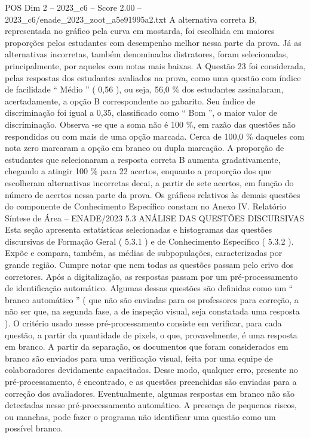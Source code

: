 \begin{textsample}{POS Dim 2 – 2023\_c6 – Score 2.00 – 2023\_c6/enade\_2023\_zoot\_a5e91995a2.txt}
A alternativa correta B, representada no gráfico pela curva em mostarda, foi escolhida em maiores proporções pelos estudantes com desempenho melhor nessa parte da prova.
Já as alternativas incorretas, também denominadas distratores, foram selecionadas, principalmente, por aqueles com notas mais baixas.
A Questão 23 foi considerada, pelas respostas dos estudantes avaliados na prova, como uma questão com índice de facilidade “ Médio ” ( 0,56 ), ou seja, 56,0 \% dos estudantes assinalaram, acertadamente, a opção B correspondente ao gabarito.
Seu índice de discriminação foi igual a 0,35, classificado como “ Bom ”, o maior valor de discriminação.
Observa -se que a soma não é 100 \%, em razão das questões não respondidas ou com mais de uma opção marcada.
Cerca de 100,0 \% daqueles com nota zero marcaram a opção em branco ou dupla marcação.
A proporção de estudantes que selecionaram a resposta correta B aumenta gradativamente, chegando a atingir 100 \% para 22 acertos, enquanto a proporção dos que escolheram alternativas incorretas decai, a partir de sete acertos, em função do número de acertos nessa parte da prova.
Os gráficos relativos às demais questões do componente de Conhecimento Específico constam no Anexo IV.
Relatório Síntese de Área – ENADE/2023 5.3 ANÁLISE DAS QUESTÕES DISCURSIVAS Esta seção apresenta estatísticas selecionadas e histogramas das questões discursivas de Formação Geral ( 5.3.1 ) e de Conhecimento Específico ( 5.3.2 ).
Expõe e compara, também, as médias de subpopulações, caracterizadas por grande região.
Cumpre notar que nem todas as questões passam pelo crivo dos corretores.
Após a digitalização, as respostas passam por um pré-processamento de identificação automático.
Algumas dessas questões são definidas como um “ branco automático ” ( que não são enviadas para os professores para correção, a não ser que, na segunda fase, a de inspeção visual, seja constatada uma resposta ).
O critério usado nesse pré-processamento consiste em verificar, para cada questão, a partir da quantidade de pixels, o que, provavelmente, é uma resposta em branco.
A partir da separação, os documentos que foram considerados em branco são enviados para uma verificação visual, feita por uma equipe de colaboradores devidamente capacitados.
Desse modo, qualquer erro, presente no pré-processamento, é encontrado, e as questões preenchidas são enviadas para a correção dos avaliadores.
Eventualmente, algumas respostas em branco não são detectadas nesse pré-processamento automático.
A presença de pequenos riscos, ou manchas, pode fazer o programa não identificar uma questão como um possível branco.

\end{textsample}
